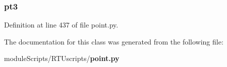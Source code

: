 \subsubsection[{pt3}]{\setlength{\rightskip}{0pt plus 5cm}pt3}\label{classpoint_1_1_point_test_aa5cd0b4261bccf2a3276158893cc8e78}


Definition at line 437 of file point.\+py.



The documentation for this class was generated from the following file\+:\begin{DoxyCompactItemize}
\item 
module\+Scripts/\+R\+T\+Uscripts/{\bf point.\+py}\end{DoxyCompactItemize}
